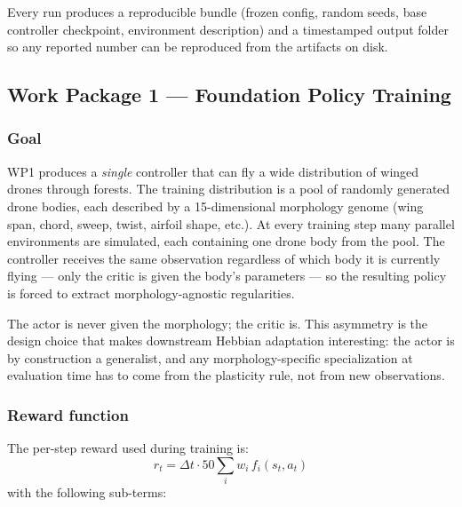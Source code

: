 \documentclass[letterpaper,10pt]{article}
\begin{document}
Every run produces a reproducible bundle (frozen config, random seeds, base controller checkpoint, environment description) and a timestamped output folder so any reported number can be reproduced from the artifacts on disk.

\subsection{Work Package 1 — Foundation Policy Training}

\subsubsection{Goal}
WP1 produces a \emph{single} controller that can fly a wide distribution of winged drones through forests. The training distribution is a pool of randomly generated drone bodies, each described by a 15-dimensional morphology genome (wing span, chord, sweep, twist, airfoil shape, etc.). At every training step many parallel environments are simulated, each containing one drone body from the pool. The controller receives the same observation regardless of which body it is currently flying --- only the critic is given the body's parameters --- so the resulting policy is forced to extract morphology-agnostic regularities.

The actor is never given the morphology; the critic is. This asymmetry is the design choice that makes downstream Hebbian adaptation interesting: the actor is by construction a generalist, and any morphology-specific specialization at evaluation time has to come from the plasticity rule, not from new observations.

\subsubsection{Reward function}
The per-step reward used during training is:
\[
r_t = \Delta t \cdot 50 \sum_{i} w_i \, f_i(s_t, a_t)
\]
with the following sub-terms:
\end{document}
